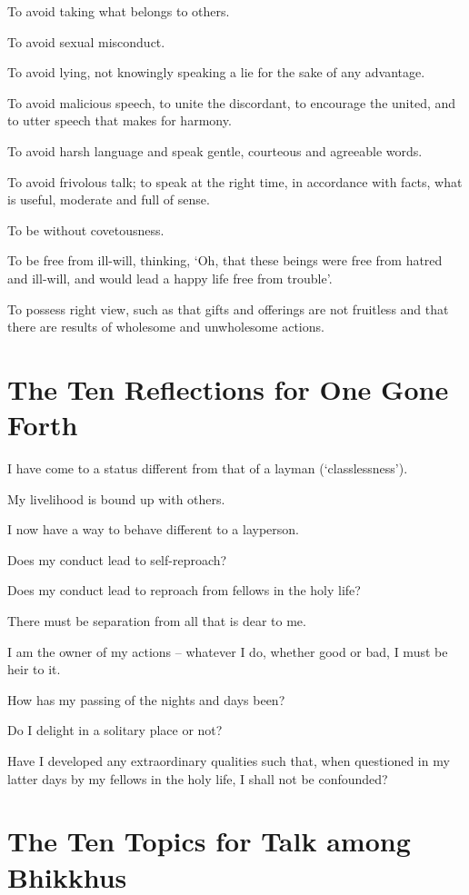 To avoid taking what belongs to others.

To avoid sexual misconduct.

To avoid lying, not knowingly speaking a lie for the sake of any advantage.

To avoid malicious speech, to unite the discordant, to encourage the united, and
to utter speech that makes for harmony.

To avoid harsh language and speak gentle, courteous and agreeable words.

To avoid frivolous talk; to speak at the right time, in accordance with facts,
what is useful, moderate and full of sense.

To be without covetousness.

To be free from ill-will, thinking, ‘Oh, that these beings were free from hatred
and ill-will, and would lead a happy life free from trouble’.

To possess right view, such as that gifts and offerings are not fruitless and
that there are results of wholesome and unwholesome actions.


\section{The Ten Reflections for One Gone Forth}

I have come to a status different from that of a layman (‘classlessness’).

My livelihood is bound up with others.

I now have a way to behave different to a layperson.

Does my conduct lead to self-reproach?

Does my conduct lead to reproach from fellows in the holy life?

There must be separation from all that is dear
to me.

I am the owner of my actions -- whatever I do, whether good or bad, I must be
heir to it.

How has my passing of the nights and days been?

Do I delight in a solitary place or not?

Have I developed any extraordinary qualities such that, when questioned in my
latter days by my fellows in the holy life, I shall not be confounded?


\section{The Ten Topics for Talk among Bhikkhus}

